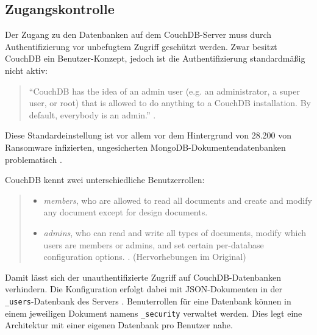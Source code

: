\subsection{Zugangskontrolle}

Der Zugang zu den Datenbanken auf dem CouchDB-Server muss durch Authentifizierung vor unbefugtem Zugriff geschützt werden. Zwar besitzt CouchDB ein Benutzer-Konzept, jedoch ist die Authentifizierung standardmäßig nicht aktiv:

\begin{citeenv}
	\begin{quotation}
		"`CouchDB has the idea of an admin user (e.g. an administrator, a super user, or root) that is allowed to do anything to a CouchDB installation. By default, everybody is an admin."' \cite{couch:security}.
	\end{quotation}
\end{citeenv}

Diese Standardeinstellung ist vor allem vor dem Hintergrund von 28.200 von Ransomware infizierten, ungesicherten MongoDB-Dokumentendatenbanken problematisch \cite{bleepingcomputer:mongodb:security}.

CouchDB kennt zwei unterschiedliche Benutzerrollen:

\begin{citeenv}
	\begin{quotation}
		\begin{itemize}
			\item \textit{members}, who are allowed to read all documents and create and modify any document except for design documents.
			\item \textit{admins}, who can read and write all types of documents, modify which users are members or admins, and set certain per-database configuration options.  \cite{couch:security}. (Hervorhebungen im Original)
		\end{itemize}
	\end{quotation}
\end{citeenv}

Damit lässt sich der unauthentifizierte Zugriff auf CouchDB-Datenbanken verhindern. Die Konfiguration erfolgt dabei mit JSON-Dokumenten in der \texttt{\_users}-Datenbank des Servers \cite{couch:security}. Benuterrollen für eine Datenbank können in einem jeweiligen Dokument namens \texttt{\_security} verwaltet werden. Dies legt eine Architektur mit einer eigenen Datenbank pro Benutzer nahe.